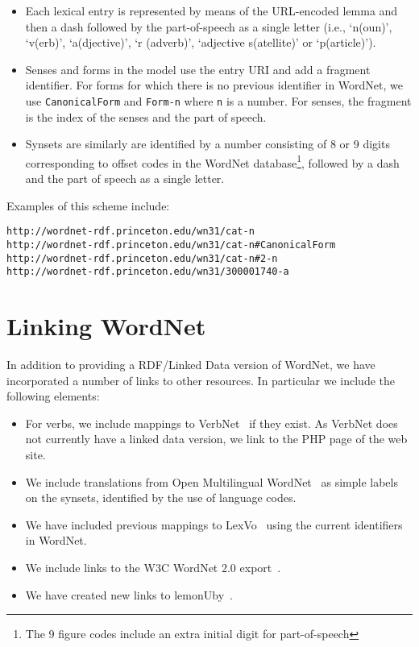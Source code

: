 \documentclass[10pt, a4paper]{article}
\begin{document}
\begin{itemize}
  \item Each lexical entry is represented by means of the URL-encoded lemma and
    then a dash followed by the part-of-speech as a single letter (i.e., `n(oun)',
    `v(erb)', `a(djective)', `r (adverb)', `adjective s(atellite)' or `p(article)').
    
  \item Senses and forms in the model use the entry URI and add a fragment identifier. For forms for which there is no previous identifier in WordNet, we
    use {\tt CanonicalForm} and {\tt Form-n} where {\tt n} is a number.
    For senses, the fragment is the index of the senses and the part of
    speech.
  \item Synsets are similarly are identified by a number consisting of 8 or 9 digits corresponding to offset codes in the WordNet database\footnote{The 9 figure codes
      include an extra initial digit for part-of-speech}, followed by a dash and the part of speech as a single letter.
\end{itemize}
Examples of this scheme include:
 
 {\scriptsize
\begin{verbatim}
http://wordnet-rdf.princeton.edu/wn31/cat-n
http://wordnet-rdf.princeton.edu/wn31/cat-n#CanonicalForm
http://wordnet-rdf.princeton.edu/wn31/cat-n#2-n
http://wordnet-rdf.princeton.edu/wn31/300001740-a
\end{verbatim}}


\section{Linking WordNet}

In addition to providing a RDF/Linked Data version of WordNet, we have incorporated a number of links to other resources. In particular
we include the following elements:

\begin{itemize}
  \item For verbs, we include mappings to VerbNet~\cite{schuler2005verbnet} if they exist. As
    VerbNet does not currently have a linked data version, we link to the
    PHP page of the web site.
  \item We include translations from Open Multilingual WordNet~\cite{bond2013linking}
    as simple labels on the synsets, identified by the use of
    language codes.
  \item We have included previous mappings to LexVo~\cite{de2008language} 
    using the current identifiers in WordNet.
  \item We include links to the W3C WordNet 2.0 export~\cite{van2006conversion}.
  \item We have created new links to lemonUby~\cite{eckle2014lemonuby}.
\end{itemize}
\end{document}
